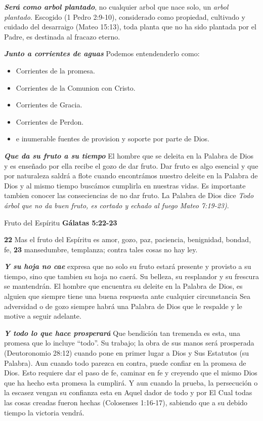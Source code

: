\textbf{\textit{Será como arbol plantado}}, no cualquier arbol que
nace solo, un \textit{arbol plantado}. Escogido (1 Pedro 2:9-10),
considerado como propiedad, cultivado y cuidado del desarraigo (Mateo
15:13), toda planta que no ha sido plantada por el Padre, es destinada
al fracazo eterno.

\textbf{\textit{Junto a corrientes de aguas}} Podemos entendenderlo como:

\begin{itemize}
  \item Corrientes de la promesa.
  \item Corrientes de la Comunion con Cristo.
  \item Corrientes de Gracia.
  \item Corrientes de Perdon.
  \item e inumerable fuentes de provision y soporte por parte de Dios.
\end{itemize}

\textbf{\textit{Que da su fruto a su tiempo}} El hombre que se
deleita en la Palabra de Dios y es enseñado por ella recibe el gozo
de dar fruto. Dar fruto es algo esencial y que por naturaleza saldrá a
flote cuando encontrámos nuestro deleite en la Palabra de Dios y al
mismo tiempo buscámos cumplirla en nuestras vidas. Es importante
tambien conocer las conseciencias de no dar fruto. La Palabra de Dios
dice \textit{Todo árbol que no da buen fruto, es cortado y echado al fuego}
\textit{Mateo 7:19-23)}.

\begin{commentbox}{Fruto del Espíritu}
  \textbf{Gálatas 5:22-23}

  \textbf{22} Mas el fruto del Espíritu es amor, gozo, paz, paciencia,
  benignidad, bondad, fe, \textbf{23} mansedumbre, templanza; contra
  tales cosas no hay ley.
\end{commentbox}

\textbf{\textit{Y su hoja no cae}} expresa que no solo su fruto
estará presente y provisto a su tiempo, sino que tambien su hoja no
caerá. Su belleza, su resplandor y su frescura se mantendrán. El
hombre que encuentra su deleite en la Palabra de Dios, es alguien que
siempre tiene una buena respuesta ante cualquier circunstancia Sea
adversidad o de gozo siempre habrá una Palabra de Dios que le
respalde y le motive a seguir adelante.

\textbf{\textit{Y todo lo que hace prosperará}} Que bendición tan
tremenda es esta, una promesa que lo incluye “todo”. Su trabajo; la
obra de sus manos será prosperada (Deutoronomio 28:12) cuando pone en
primer lugar a Dios y Sus Estatutos (su Palabra). Aun cuando todo
parezca en contra, puede confiar en la promesa de Dios. Esto requiere
dar el paso de fe, caminar en fe y creyendo que el mismo Dios que ha
hecho esta promesa la cumplirá. Y aun cuando la prueba, la
persecución o la escasez vengan su confianza esta en Aquel dador de
todo y por El Cual todas las cosas creadas fueron hechas (Colosenses
1:16-17), sabiendo que a su debido tiempo la victoria vendrá.

